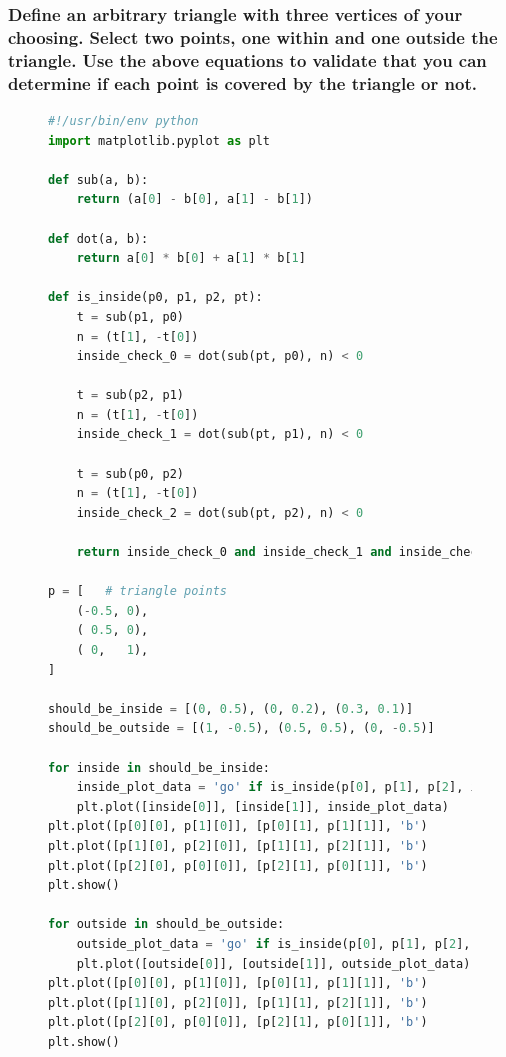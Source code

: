 \documentclass[a4paper, titlepage,12pt]{article}
\begin{document}
	\subsubsection*{Define an arbitrary triangle with three vertices of your choosing. Select two points, one within and one outside the triangle. Use the above equations to validate that you can determine if each point is covered by the triangle or not.}
	\begin{figure}
		\begin{center}
			\begin{lstlisting}[language=Python]
#!/usr/bin/env python
import matplotlib.pyplot as plt

def sub(a, b):
    return (a[0] - b[0], a[1] - b[1])

def dot(a, b):
    return a[0] * b[0] + a[1] * b[1]

def is_inside(p0, p1, p2, pt):
    t = sub(p1, p0)
    n = (t[1], -t[0])
    inside_check_0 = dot(sub(pt, p0), n) < 0

    t = sub(p2, p1)
    n = (t[1], -t[0])
    inside_check_1 = dot(sub(pt, p1), n) < 0

    t = sub(p0, p2)
    n = (t[1], -t[0])
    inside_check_2 = dot(sub(pt, p2), n) < 0

    return inside_check_0 and inside_check_1 and inside_check_2

p = [	# triangle points
    (-0.5, 0),
    ( 0.5, 0),
    ( 0,   1),
]

should_be_inside = [(0, 0.5), (0, 0.2), (0.3, 0.1)]
should_be_outside = [(1, -0.5), (0.5, 0.5), (0, -0.5)]

for inside in should_be_inside:
    inside_plot_data = 'go' if is_inside(p[0], p[1], p[2], inside) else 'ro'
    plt.plot([inside[0]], [inside[1]], inside_plot_data)
plt.plot([p[0][0], p[1][0]], [p[0][1], p[1][1]], 'b')
plt.plot([p[1][0], p[2][0]], [p[1][1], p[2][1]], 'b')
plt.plot([p[2][0], p[0][0]], [p[2][1], p[0][1]], 'b')
plt.show()

for outside in should_be_outside:
    outside_plot_data = 'go' if is_inside(p[0], p[1], p[2], outside) else 'ro'
    plt.plot([outside[0]], [outside[1]], outside_plot_data)
plt.plot([p[0][0], p[1][0]], [p[0][1], p[1][1]], 'b')
plt.plot([p[1][0], p[2][0]], [p[1][1], p[2][1]], 'b')
plt.plot([p[2][0], p[0][0]], [p[2][1], p[0][1]], 'b')
plt.show()
			\end{lstlisting}
		\end{center}
	\end{figure}
\end{document}
